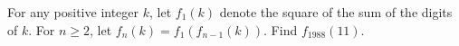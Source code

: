 For any positive integer $k$, let $f_1(k)$ denote the square of the sum of the digits of $k$.  For $n \ge 2$, let $f_n(k) = f_1(f_{n - 1}(k))$.  Find $f_{1988}(11)$.